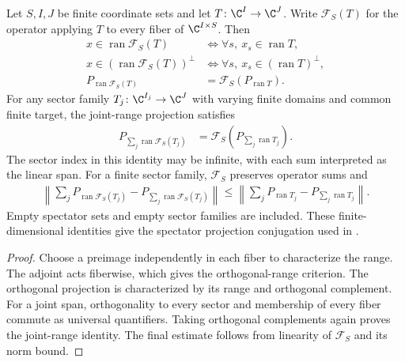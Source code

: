 \begin{lemma}
    \label{thm:euclidean_fiberwise_projection}
    \leanok
    Let $S,I,J$ be finite coordinate sets and let $T\colon\C^I\to\C^J$.
    Write $\mathcal F_S(T)$ for the operator applying $T$ to every fiber
    of $\C^{I\times S}$. Then
    \begin{align}
        x\in\operatorname{ran}\mathcal F_S(T)
         & \Longleftrightarrow \forall s,\ x_s\in\operatorname{ran}T,         \\
        x\in(\operatorname{ran}\mathcal F_S(T))^\perp
         & \Longleftrightarrow \forall s,\ x_s\in(\operatorname{ran}T)^\perp, \\
        P_{\operatorname{ran}\mathcal F_S(T)}
         & =\mathcal F_S(P_{\operatorname{ran}T}).
    \end{align}
    For any sector family $T_j\colon\C^{I_j}\to\C^J$ with varying finite
    domains and common finite target, the joint-range projection satisfies
    \begin{align}
        P_{\sum_j\operatorname{ran}\mathcal F_S(T_j)}
         & =\mathcal F_S(P_{\sum_j\operatorname{ran}T_j}).
    \end{align}
    The sector index in this identity may be infinite, with each sum
    interpreted as the linear span. For a finite sector family,
    $\mathcal F_S$ preserves operator sums and
    \begin{align}
        \left\|\sum_jP_{\operatorname{ran}\mathcal F_S(T_j)}
        -P_{\sum_j\operatorname{ran}\mathcal F_S(T_j)}\right\|
        \leq
        \left\|\sum_jP_{\operatorname{ran}T_j}
        -P_{\sum_j\operatorname{ran}T_j}\right\|.
    \end{align}
    Empty spectator sets and empty sector families are included. These
    finite-dimensional identities give the spectator projection conjugation
    used in \cite[Lemma~commutation(i)]{Nachtergaele1996Spectral}.
\end{lemma}
\begin{proof}\leanok
    Choose a preimage independently in each fiber to characterize the range.
    The adjoint acts fiberwise, which gives the orthogonal-range criterion.
    The orthogonal projection is characterized by its range and orthogonal
    complement. For a joint span, orthogonality to every sector and membership
    of every fiber commute as universal quantifiers. Taking orthogonal
    complements again proves the joint-range identity. The final estimate
    follows from linearity of $\mathcal F_S$ and its norm bound.
\end{proof}

